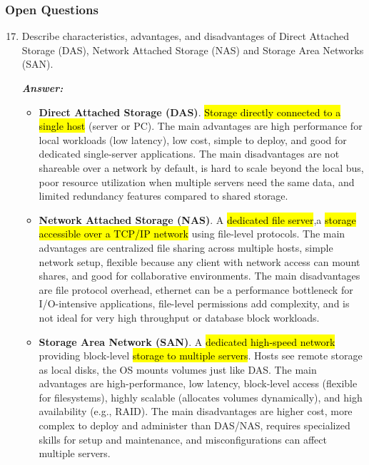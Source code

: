 \newpage

\subsubsection*{Open Questions}

\begin{enumerate}
    \setcounter{enumi}{16}

    \item Describe characteristics, advantages, and disadvantages of Direct Attached Storage (DAS), Network Attached Storage (NAS) and Storage Area Networks (SAN).

    \textcolor{Green3}{\textbf{\emph{Answer:}}}
    \begin{itemize}
        \item \textbf{Direct Attached Storage (DAS)}. \hl{Storage directly connected to a single host} (server or PC). The main advantages are high performance for local workloads (low latency), low cost, simple to deploy, and good for dedicated single-server applications. The main disadvantages are not shareable over a network by default, is hard to scale beyond the local bus, poor resource utilization when multiple servers need the same data, and limited redundancy features compared to shared storage.
        \item \textbf{Network Attached Storage (NAS)}. A \hl{dedicated file server},\break a \hl{storage accessible over a TCP/IP network} using file-level protocols. The main advantages are centralized file sharing across multiple hosts, simple network setup, flexible because any client with network access can mount shares, and good for collaborative environments. The main disadvantages are file protocol overhead, ethernet can be a performance bottleneck for I/O-intensive applications, file-level permissions add complexity, and is not ideal for very high throughput or database block workloads.
        \item \textbf{Storage Area Network (SAN)}. A \hl{dedicated high-speed network} providing block-level \hl{storage to multiple servers}. Hosts see remote storage as local disks, the OS mounts volumes just like DAS. The main advantages are high-performance, low latency, block-level access (flexible for filesystems), highly scalable (allocates volumes dynamically), and high availability (e.g., RAID). The main disadvantages are higher cost, more complex to deploy and administer than DAS/NAS, requires specialized skills for setup and maintenance, and misconfigurations can affect multiple servers.
    \end{itemize}



\end{enumerate}
